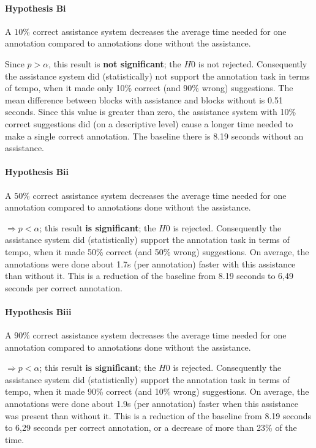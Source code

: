 	\paragraph{Hypothesis Bi}
	\lqq A \(10\%\) correct assistance system decreases the average time needed for one annotation compared to annotations done without the assistance.\rqq

	Since \(p > \alpha\), this result is \textbf{not significant}; the $H0$ is not rejected.
	Consequently the assistance system did (statistically) not support the annotation task in terms of tempo, when it made only 10\% correct (and 90\% wrong) suggestions. The mean difference between blocks with assistance and blocks without is 0.51 seconds. Since this value is greater than zero, the assistance system with 10\% correct suggestions did (on a descriptive level) cause a longer time needed to make a single correct annotation. The baseline there is 8.19 seconds without an assistance.

	\paragraph{Hypothesis Bii}
	\lqq A \(50\%\) correct assistance system decreases the average time needed for one annotation compared to annotations done without the assistance.\rqq

	\(\Rightarrow p < \alpha\); this result \textbf{is significant}; the $H0$ is rejected.
	Consequently the assistance system did (statistically) support the annotation task in terms of tempo, when it made 50\% correct (and 50\% wrong) suggestions. On average, the annotations were done about 1.7s (per annotation) faster with this assistance than without it. This is a reduction of the baseline from 8.19 seconds to 6,49 seconds per correct annotation.

	\paragraph{Hypothesis Biii}
	\lqq A \(90\%\) correct assistance system decreases the average time needed for one annotation compared to annotations done without the assistance.\rqq

	\(\Rightarrow p < \alpha\); this result \textbf{is significant}; the $H0$ is rejected.
	Consequently the assistance system did (statistically) support the annotation task in terms of tempo, when it made 90\% correct (and 10\% wrong) suggestions. On average, the annotations were done about 1.9s (per annotation) faster when this assistance was present than without it. This is a reduction of the baseline from 8.19 seconds to 6,29 seconds per correct annotation, or a decrease of more than 23\% of the time.



